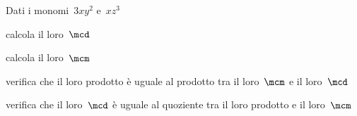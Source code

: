 \begin{esercizio}
 \label{ese:9.49}
Dati i monomi~\(3xy^{2}\) e~\(xz^{3}\)

\begin{enumeratea}
\item calcola il loro~\(\mcd\)
\item calcola il loro~\(\mcm\)
\item verifica che il loro prodotto è uguale al prodotto tra il loro~\(\mcm\) e il 
loro~\(\mcd\)
\item verifica che il loro~\(\mcd\) è uguale al quoziente tra il loro prodotto e 
il loro~\(\mcm\)
\end{enumeratea}
\end{esercizio}



